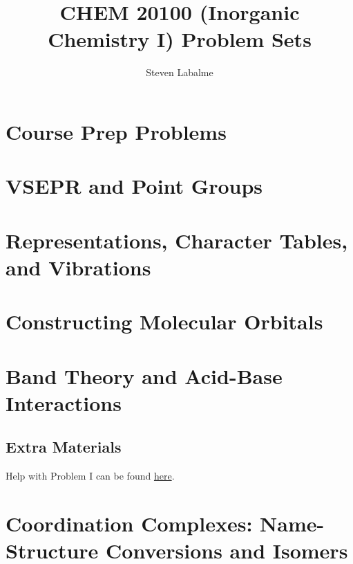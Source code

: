 \documentclass[titlepage]{article}
\title{CHEM 20100 (Inorganic Chemistry I) Problem Sets}
\author{Steven Labalme}
\begin{document}
\maketitle



\tableofcontents
\newpage



\pagestyle{main}
\renewcommand{\leftmark}{Problem Set \thesection}
\setcounter{section}{-1}
\section{Course Prep Problems}

\newpage



\section{VSEPR and Point Groups}

\newpage



\section{Representations, Character Tables, and Vibrations}

\newpage



\section{Constructing Molecular Orbitals}

\newpage



\section{Band Theory and Acid-Base Interactions}



\subsection{Extra Materials}
Help with Problem I can be found \href{https://courses.cit.cornell.edu/ece407/Lectures/handout3.pdf?fbclid=IwAR3KV4T7d_OBTlnd5kNTxmYTSlkJJSWLNfx8YGSNt-mtykwIfxkG4nWkGoQ}{here}.
\newpage



\section{Coordination Complexes: Name-Structure Conversions and Isomers}

\newpage
\end{document}
